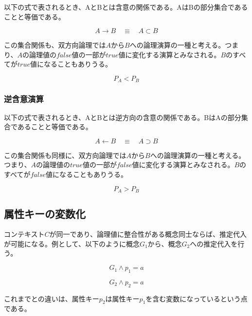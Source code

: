 \documentclass[12pt]{article}
\begin{document}
以下の式で表されるとき、AとBとは含意の関係である。AはBの部分集合であることと等価である。

\begin{equation} A \rightarrow B \quad \equiv \quad A\subset B\end{equation}

この集合関係も、双方向論理では\(A\)から\(B\)への論理演算の一種と考える。つまり、\(A\)の論理値の\(false\)値の一部が\(true\)値に変化する演算とみなされる。\(B\)のすべてが\(true\)値になることもありうる。

\begin{equation}P_{A}<P_{B}\end{equation}

\subsubsection{逆含意演算}\label{ux9006ux542bux610fux6f14ux7b97}

以下の式で表されるとき、AとBとは逆方向の含意の関係である。BはAの部分集合であることと等価である。

\begin{equation} A \leftarrow B \quad \equiv \quad A\supset B\end{equation}

この集合関係も同様に、双方向論理では\(A\)から\(B\)への論理演算の一種と考える。つまり、\(A\)の論理値の\(true\)値の一部が\(false\)値に変化する演算とみなされる。\(B\)のすべてが\(false\)値になることもありうる。

\begin{equation}P_{A}>P_{B}\end{equation}

\subsection{属性キーの変数化}\label{ux5c5eux6027ux30adux30fcux306eux5909ux6570ux5316}

コンテキスト\(C\)が同一であり、論理値に整合性がある概念同士ならば、推定代入が可能になる。例として、以下のように概念\(G_1\)から、概念\(G_2\)への推定代入を行う。

\begin{equation} G_1 \wedge p_1 = a \end{equation}

\begin{equation} G_2 \wedge p_2 = a \end{equation}

これまでとの違いは、属性キー\(p_2\)は属性キー\(p_1\)を含む変数になっているという点である。
\end{document}
